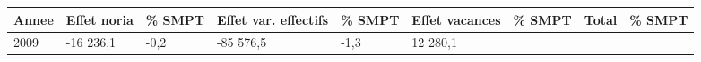 \begin{longtable}[]{@{}lllllllll@{}}
\toprule
\begin{minipage}[b]{0.05\columnwidth}\raggedright
Annee\strut
\end{minipage} & \begin{minipage}[b]{0.10\columnwidth}\raggedright
Effet noria\strut
\end{minipage} & \begin{minipage}[b]{0.06\columnwidth}\raggedright
\% SMPT\strut
\end{minipage} & \begin{minipage}[b]{0.16\columnwidth}\raggedright
Effet var. effectifs\strut
\end{minipage} & \begin{minipage}[b]{0.06\columnwidth}\raggedright
\% SMPT\strut
\end{minipage} & \begin{minipage}[b]{0.12\columnwidth}\raggedright
Effet vacances\strut
\end{minipage} & \begin{minipage}[b]{0.06\columnwidth}\raggedright
\% SMPT\strut
\end{minipage} & \begin{minipage}[b]{0.09\columnwidth}\raggedright
Total\strut
\end{minipage} & \begin{minipage}[b]{0.06\columnwidth}\raggedright
\% SMPT\strut
\end{minipage}\tabularnewline
\midrule
\endhead
\begin{minipage}[t]{0.05\columnwidth}\raggedright
2009\strut
\end{minipage} & \begin{minipage}[t]{0.10\columnwidth}\raggedright
-16 236,1\strut
\end{minipage} & \begin{minipage}[t]{0.06\columnwidth}\raggedright
-0,2\strut
\end{minipage} & \begin{minipage}[t]{0.16\columnwidth}\raggedright
-85 576,5\strut
\end{minipage} & \begin{minipage}[t]{0.06\columnwidth}\raggedright
-1,3\strut
\end{minipage} & \begin{minipage}[t]{0.12\columnwidth}\raggedright
12 280,1\strut
\end{minipage} & \begin{minipage}[t]{0.06\columnwidth}\raggedright

\end{minipage}
\end{longtable}
